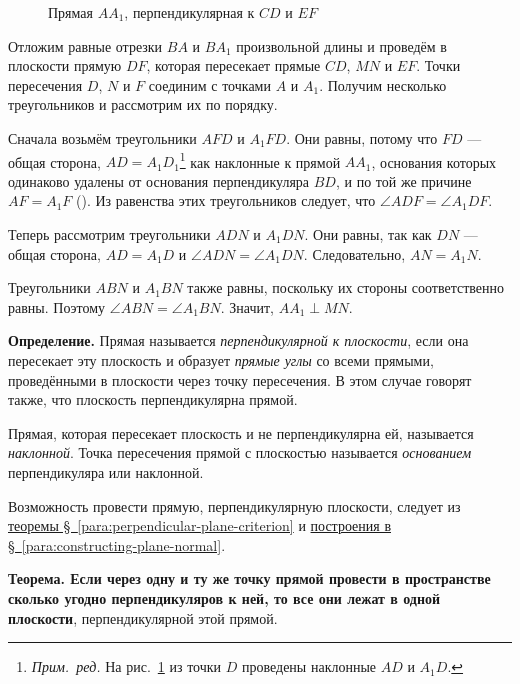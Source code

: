 \begin{figure}[htbp]
    \centering
    \renewcommand{\thefigure}{305}
    \captionsetup{name=Рис.,labelsep=period}
    
    \caption{Прямая \(AA_1\), перпендикулярная к \(CD\) и \(EF\)}\label{fig:kiselev-stereo-305}
\end{figure}

Отложим равные отрезки \(BA\) и \(BA_1\) произвольной длины и проведём в плоскости прямую \(DF\), которая пересекает прямые \(CD\), \(MN\) и \(EF\).
Точки пересечения \(D\), \(N\) и \(F\) соединим с точками \(A\) и \(A_1\). Получим несколько треугольников и рассмотрим их по порядку.

Сначала возьмём треугольники \(AFD\) и \(A_1FD\). Они равны, потому что \(FD\) --- общая сторона, \(AD=A_1D_1\)\footnote{\emph{Прим.~ред.} На рис.~\ref{fig:kiselev-stereo-305} из точки \(D\) проведены наклонные \(AD\) и \(A_1D\).} как наклонные к прямой \(AA_1\), основания которых одинаково удалены от основания перпендикуляра \(BD\), и по той же причине \(AF=A_1F\) (). Из равенства этих треугольников следует, что \(\angle ADF=\angle A_1DF\).

Теперь рассмотрим треугольники \(ADN\) и \(A_1DN\). Они равны, так как \(DN\) --- общая сторона, \(AD=A_1D\) и \(\angle ADN=\angle A_1DN\). Следовательно, \(AN=A_1N\).

Треугольники \(ABN\) и \(A_1BN\) также равны, поскольку их стороны соответственно равны. Поэтому \(\angle ABN=\angle A_1BN\). Значит, \(AA_1\perp MN\).

 \textbf{Определение.} Прямая называется \emph{перпендикулярной к плоскости}, если она пересекает эту плоскость и образует \emph{прямые углы} со всеми прямыми, проведёнными в плоскости через точку пересечения. В этом случае говорят также, что плоскость перпендикулярна прямой.

Прямая, которая пересекает плоскость и не перпендикулярна ей, называется \emph{наклонной}. Точка пересечения прямой с плоскостью называется \emph{основанием} перпендикуляра или наклонной.

Возможность провести прямую, перпендикулярную плоскости, следует из \hyperref[para:perpendicular-plane-criterion]{теоремы §~\ref*{para:perpendicular-plane-criterion}} и \hyperref[para:constructing-plane-normal]{построения в §~\ref*{para:constructing-plane-normal}}.

 \textbf{Теорема. Если через одну и ту же точку прямой провести в пространстве сколько угодно перпендикуляров к ней, то все они лежат в одной плоскости}, перпендикулярной этой прямой.

